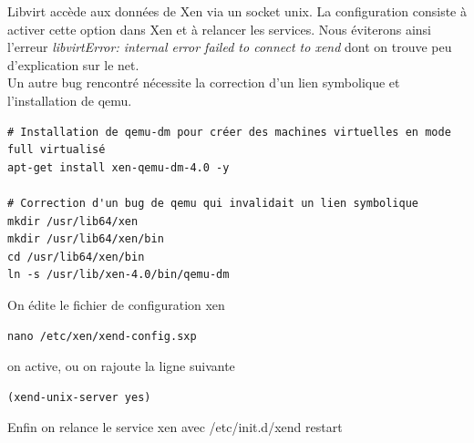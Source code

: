 Libvirt accède aux données de Xen via un socket unix. La configuration consiste à activer cette option dans Xen et à relancer les services.
Nous éviterons ainsi l’erreur \emph{libvirtError: internal error failed to connect to xend} dont on trouve peu d’explication sur le net.
\\
Un autre bug rencontré nécessite la correction d'un lien symbolique et l'installation de qemu.

\begin{lstlisting}
# Installation de qemu-dm pour créer des machines virtuelles en mode full virtualisé
apt-get install xen-qemu-dm-4.0 -y

# Correction d'un bug de qemu qui invalidait un lien symbolique
mkdir /usr/lib64/xen
mkdir /usr/lib64/xen/bin
cd /usr/lib64/xen/bin
ln -s /usr/lib/xen-4.0/bin/qemu-dm
\end{lstlisting} 

On édite le fichier de configuration xen
\begin{lstlisting} 
nano /etc/xen/xend-config.sxp
\end{lstlisting}
 on active, ou on rajoute la ligne suivante
\begin{lstlisting} 
(xend-unix-server yes)
\end{lstlisting}
 Enfin on relance le service xen avec /etc/init.d/xend restart

